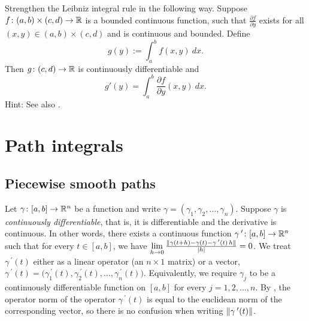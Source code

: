 \begin{exercise} \label{exercise:strongerleibniz}
Strengthen the Leibniz integral rule in the following way.
Suppose $f \colon (a,b) \times (c,d) \to {\mathbb{R}}$ is a bounded continuous function,
such that $\frac{\partial f}{\partial y}$ exists for all $(x,y) \in (a,b)
\times (c,d)$ and is continuous and bounded.  Define
\begin{equation*}
g(y) := \int_a^b f(x,y) ~dx .
\end{equation*}
Then $g \colon (c,d) \to {\mathbb{R}}$ is continuously differentiable and
\begin{equation*}
g'(y) = \int_a^b \frac{\partial f}{\partial y}(x,y) ~dx .
\end{equation*}
Hint: See also .
\end{exercise}


\sectionnewpage
\section{Path integrals}
\label{sec:pathintegral}


\subsection{Piecewise smooth paths}

Let $\gamma \colon [a,b] \to {\mathbb{R}}^n$ be a function and write
$\gamma = (\gamma_1,\gamma_2,\ldots,\gamma_n)$. 
Suppose $\gamma$ is 
\emph{continuously differentiable},
that is,
it is differentiable and the derivative is continuous.
In other words, there exists a continuous function $\gamma^{\:\prime} \colon [a,b]
\to {\mathbb{R}}^n$ such that for every $t \in [a,b]$, we have
$\lim\limits_{h \to 0}
\frac{\lVert {\gamma(t+h)-\gamma(t) - \gamma^{\:\prime}(t) \, h} \rVert}{\lvert {h} \rvert} = 0$.
We treat
$\gamma^{\:\prime}(t)$ either as a linear operator (an $n \times 1$ matrix) or
a vector,
$\gamma^{\:\prime}(t) =
\bigl( \gamma_1^{\:\prime}(t), \gamma_2^{\:\prime}(t), \ldots,
\gamma_n^{\:\prime}(t) \bigr)$.
Equivalently, we require
$\gamma_j$ to be a continuously differentiable function on $[a,b]$
for every $j=1,2,\ldots,n$.
By , the operator norm of
the operator $\gamma^{\:\prime}(t)$ is equal to
the euclidean norm of the corresponding vector, so there is no
confusion when writing $\lVert {\gamma^{\:\prime}(t)} \rVert$.

